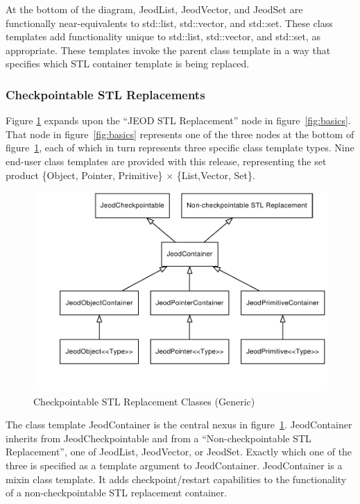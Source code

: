 At the bottom of the diagram, JeodList, JeodVector, and JeodSet are functionally
near-equivalents to std::list, std::vector, and std::set.
These class templates add functionality unique to std::list, std::vector,
and std::set, as appropriate.
These templates invoke the parent class template in a way that specifies
which STL container template is being replaced.

\subsubsection{Checkpointable STL Replacements}
Figure \ref{fig:stl_replacements_expansion} expands upon the
``JEOD STL Replacement'' node in figure~\ref{fig:basics}.
That node in figure~\ref{fig:basics} represents one of the three nodes at
the bottom of figure~\ref{fig:stl_replacements_expansion}, each of which
in turn represents three specific class template types.
Nine end-user class templates are provided with this release, representing
the set product
\{Object, Pointer, Primitive\} $\times$ \{List,Vector, Set\}.

\begin{figure}[htbp]
\centering
\includegraphics{stl_replacements_expansion}
\caption{Checkpointable STL Replacement Classes (Generic)}
\label{fig:stl_replacements_expansion}
\end{figure}

The class template JeodContainer is the central nexus in
figure~\ref{fig:stl_replacements_expansion}. JeodContainer inherits from
JeodCheckpointable and from a ``Non-checkpointable STL Replacement'',
one of JeodList, JeodVector, or JeodSet.
Exactly which one of the three is specified as a template argument
to JeodContainer. JeodContainer is a mixin class template.
It adds checkpoint/restart capabilities to the functionality of a
non-checkpointable STL replacement container.

